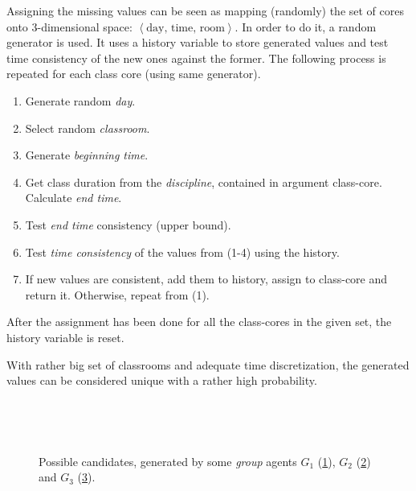 \documentclass[../../ThesisDoc]{subfiles}
\begin{document}
Assigning the missing values can be seen as mapping (randomly) the set of cores onto
3-dimensional space: $\left< \text{day, time, room} \right>$.
In order to do it, a random generator is used. It uses a history variable to
store generated values and test time consistency of the new ones against the former.
The following process is repeated for each class core (using same generator).
\begin{enumerate}
  \item Generate random \emph{day}.
  \item Select random \emph{classroom}.
  \item Generate \emph{beginning time}.
  \item Get class duration from the \emph{discipline}, contained in argument class-core.
        Calculate \emph{end time}.
  \item Test \emph{end time} consistency (upper bound).
  \item Test \emph{time consistency} of the values from (1-4) using the history.
  \item If new values are consistent, add them to history, assign to class-core
        and return it.
        Otherwise, repeat from (1).

\end{enumerate}
After the assignment has been done for all the class-cores in the given set,
the history variable is reset.

\medskip

With rather big set of classrooms and adequate time discretization, the generated
values can be considered unique with a rather high probability.





\begin{figure}[h]
  \begin{subfigure}{0.3\textwidth}
    \drawFirstAlone{2cm} %
    \caption{}
    \label{fig:candidate-1}
  \end{subfigure}
  ~
  \begin{subfigure}{0.3\textwidth}
    \drawSecondAlone[trim left, xshift=1.7cm]{2cm} %
    \caption{}
    \label{fig:candidate-2}
  \end{subfigure}
  ~
  \begin{subfigure}{0.3\textwidth}
    \drawThirdAlone{2cm} %
    \caption{}
    \label{fig:candidate-3}
  \end{subfigure}

  \caption{Possible candidates, generated by some \emph{group} agents
            $G_1$ (\ref{fig:candidate-1}), $G_2$ (\ref{fig:candidate-2}) and
            $G_3$ (\ref{fig:candidate-3}).}
  \label{fig:candidates-alone}
\end{figure}
\end{document}
